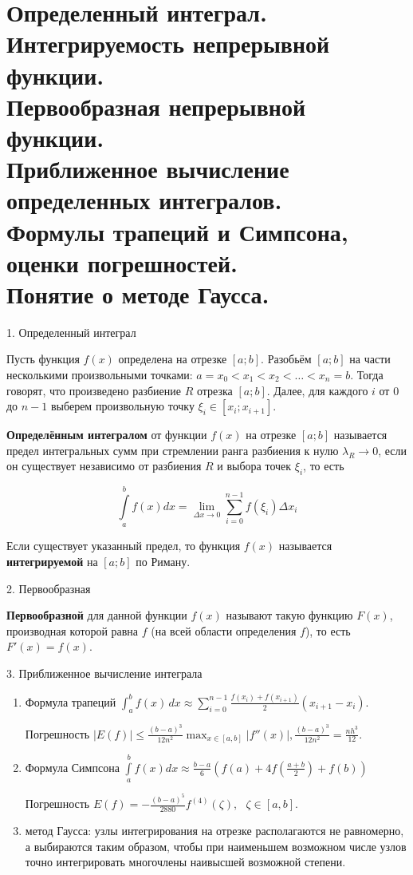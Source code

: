 \section{
    Определенный интеграл. Интегрируемость непрерывной функции. \\
    Первообразная непрерывной функции.  \\
    Приближенное вычисление определенных интегралов. \\
    Формулы трапеций и Симпсона, оценки погрешностей. \\
    Понятие о методе Гаусса. 
}

1. Определенный интеграл

Пусть функция $f(x)$ определена на отрезке $[a;b]$. Разобьём $[a;b]$ на части несколькими произвольными точками: 
$a=x_{{0}}<x_{{1}}<x_{{2}}<\ldots <x_{{n}}=b$. Тогда говорят, что произведено разбиение $R$ отрезка $[a;b]$. 
Далее, для каждого $i$ от $0$ до $n-1$ выберем произвольную точку $\xi _{{i}}\in [x_{{i}};x_{{i+1}}]$.

\textbf{Определённым интегралом} от функции $f(x)$ на отрезке $[a;b]$ называется предел интегральных сумм при стремлении 
ранга разбиения к нулю $\lambda _{{R}}\rightarrow 0$, если он существует независимо от разбиения 
$R$ и выбора точек $\xi _{{i}}$, то есть

$$
\int \limits _{{a}}^{{b}}f(x)dx=\lim \limits _{{\Delta x\rightarrow 0}}\sum \limits _{{i=0}}^{{n-1}}f(\xi _{{i}})\Delta x_{{i}}
$$

Если существует указанный предел, то функция $f(x)$ называется \textbf{интегрируемой} на $[a;b]$ по Риману.

2. Первообразная

\textbf{Первообразной} для данной функции $f(x)$ называют
такую функцию $F(x)$, производная которой равна $f$ (на всей области определения $f$), то есть 
$F'(x)=f(x)$.

3. Приближенное вычисление интеграла

\begin{enumerate}
    \item Формула трапеций 
    $\displaystyle \int_{a}^{b}f(x)\,dx\approx \sum _{{i=0}}^{{n-1}}{\frac  {f(x_{i})+f(x_{{i+1}})}{2}}(x_{{i+1}}-x_{{i}})$.
    
    Погрешность ${\displaystyle \left|E(f)\right|\leqslant {\frac {\left(b-a\right)^{3}}{12n^{2}}}\max _{x\in [a,b]}\left|f''(x)\right|,{\frac {(b-a)^{3}}{12n^{2}}}={\frac {nh^{3}}{12}}.}$
    \item Формула Симпсона 
    $\displaystyle \int \limits _{a}^{b}f(x)dx \approx \frac{b-a}{6} \left(f(a)+4f\left(\frac{a+b}{2}\right)+f(b)\right)$
    
    Погрешность $\displaystyle E(f)=-{\frac  {(b-a)^{5}}{2880}}{{f^{{(4)}}(\zeta )}},\ \ \ \zeta \in [a,b].$
    
    \item метод Гаусса: узлы интегрирования  на отрезке  располагаются не равномерно, а выбираются таким образом,
    чтобы при наименьшем возможном числе узлов точно интегрировать многочлены наивысшей возможной степени.
\end{enumerate}